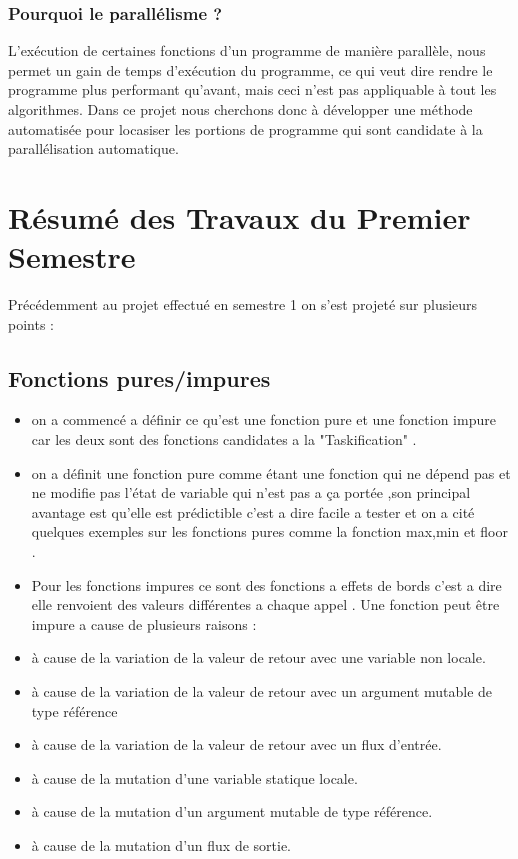 \documentclass[12pt,titlepage]{article}
\begin{document}
\subsubsection{Pourquoi le parallélisme ?}

 L’exécution de  certaines fonctions d'un programme de manière parallèle, nous permet un gain de temps d'exécution du programme, ce qui veut dire rendre le programme plus performant qu'avant, mais ceci n'est pas appliquable à tout les algorithmes. Dans ce projet nous cherchons donc à développer une méthode automatisée pour locasiser les portions de programme qui sont candidate à la parallélisation automatique.

\section{Résumé des Travaux du Premier Semestre}

Précédemment au projet effectué en semestre 1 on s'est projeté sur plusieurs points : 

\subsection{Fonctions pures/impures}
\begin{itemize}
    \item on a commencé a définir ce qu'est une fonction pure et une fonction impure car les deux sont des fonctions candidates a la "Taskification" .
    \item on a définit une fonction pure comme étant une fonction qui ne dépend pas et ne modifie pas l'état de variable qui n'est pas a ça portée ,son principal avantage est qu'elle est prédictible c'est a dire facile a tester  et on a cité quelques exemples sur les fonctions pures comme la fonction max,min et floor .
    \item Pour les fonctions impures ce sont des fonctions a effets de bords c'est a dire elle renvoient des valeurs différentes a chaque appel . Une fonction peut être impure a cause de plusieurs raisons :
    \item à cause de la variation de la valeur de retour avec une variable non locale.
    \item à cause de la variation de la valeur de retour avec un argument mutable de type référence
    \item à cause de la variation de la valeur de retour avec un flux d’entrée.
    \item à cause de la mutation d’une variable statique locale.
    \item à cause de la mutation d’un argument mutable de type référence.
    \item à cause de la mutation d’un flux de sortie.
\end{itemize}
\end{document}
